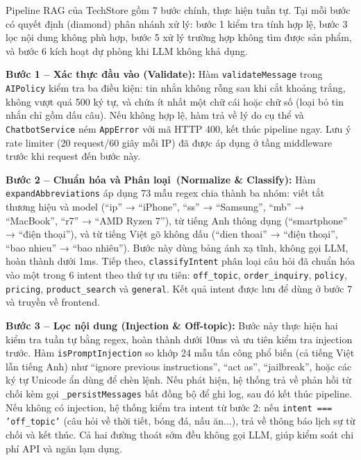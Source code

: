 \begin{sloppypar}
Pipeline RAG của TechStore gồm 7 bước chính, thực hiện tuần tự. Tại mỗi bước có quyết định (diamond) phân nhánh xử lý: bước 1 kiểm tra tính hợp lệ, bước 3 lọc nội dung không phù hợp, bước 5 xử lý trường hợp không tìm được sản phẩm, và bước 6 kích hoạt dự phòng khi LLM không khả dụng.

\textbf{Bước 1 -- Xác thực đầu vào (Validate):} Hàm \texttt{validateMessage} trong \texttt{AIPolicy} kiểm tra ba điều kiện: tin nhắn không rỗng sau khi cắt khoảng trắng, không vượt quá 500 ký tự, và chứa ít nhất một chữ cái hoặc chữ số (loại bỏ tin nhắn chỉ gồm dấu câu). Nếu không hợp lệ, hàm trả về lý do cụ thể và \texttt{ChatbotService} ném \texttt{AppError} với mã HTTP 400, kết thúc pipeline ngay. Lưu ý rate limiter (20 request/60 giây mỗi IP) đã được áp dụng ở tầng middleware trước khi request đến bước này.

\textbf{Bước 2 -- Chuẩn hóa và Phân loại\allowbreak\ (Normalize \& Classify):} Hàm \linebreak[0]\texttt{expandAbbreviations} áp dụng 73 mẫu regex chia thành ba nhóm: viết tắt thương hiệu và model (``ip'' → ``iPhone'', ``ss'' → ``Samsung'', ``mb'' → ``MacBook'', ``r7'' → ``AMD Ryzen 7''), từ tiếng Anh thông dụng (``smartphone'' → ``điện thoại''), và từ tiếng Việt gõ không dấu (``dien thoai'' → ``điện thoại'', ``bao nhieu'' → ``bao nhiêu''). Bước này dùng bảng ánh xạ tĩnh, không gọi LLM, hoàn thành dưới 1ms. Tiếp theo, \texttt{classifyIntent} phân loại câu hỏi đã chuẩn hóa vào một trong 6 intent theo thứ tự ưu tiên: \texttt{off\_topic}, \texttt{order\_inquiry}, \texttt{policy}, \texttt{pricing}, \texttt{product\_search} và \texttt{general}. Kết quả intent được lưu để dùng ở bước 7 và truyền về frontend.

\textbf{Bước 3 -- Lọc nội dung (Injection \& Off-topic):} Bước này thực hiện hai kiểm tra tuần tự bằng regex, hoàn thành dưới 10ms và ưu tiên kiểm tra injection trước. Hàm \texttt{isPromptInjection} so khớp 24 mẫu tấn công phổ biến (cả tiếng Việt lẫn tiếng Anh) như ``ignore previous instructions'', ``act as'', ``jailbreak'', hoặc các ký tự Unicode ẩn dùng để chèn lệnh. Nếu phát hiện, hệ thống trả về phản hồi từ chối kèm gọi \texttt{\_persistMessages} bất đồng bộ để ghi log, sau đó kết thúc pipeline. Nếu không có injection, hệ thống kiểm tra intent từ bước 2: nếu \texttt{intent === 'off\_topic'} (câu hỏi về thời tiết, bóng đá, nấu ăn...), trả về thông báo lịch sự từ chối và kết thúc. Cả hai đường thoát sớm đều không gọi LLM, giúp kiểm soát chi phí API và ngăn lạm dụng.


\end{sloppypar}
